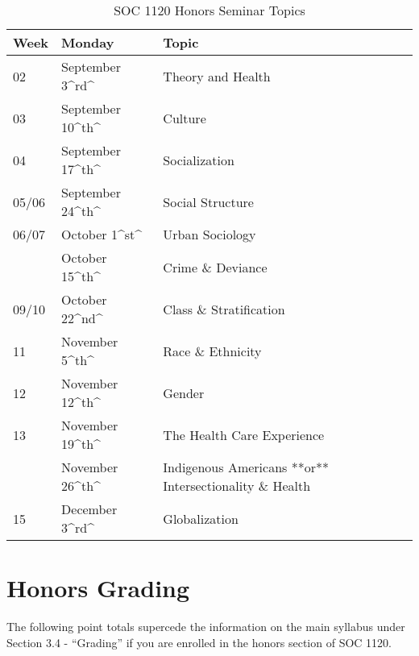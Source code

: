 \documentclass[]{book}
\theoremstyle{definition}
\theoremstyle{definition}
\theoremstyle{definition}
\theoremstyle{remark}
\begin{document}
\begin{table}

\caption{\label{tab:unnamed-chunk-4}SOC 1120 Honors Seminar Topics}
\centering
\begin{tabular}[t]{lll}
\toprule
Week & Monday & Topic\\
\midrule
02 & September 3\textasciicircum{}rd\textasciicircum{} & Theory and Health\\
03 & September 10\textasciicircum{}th\textasciicircum{} & Culture\\
04 & September 17\textasciicircum{}th\textasciicircum{} & Socialization\\
05/06 & September 24\textasciicircum{}th\textasciicircum{} & Social Structure\\
06/07 & October 1\textasciicircum{}st\textasciicircum{} & Urban Sociology\\
\addlinespace
08 & October 15\textasciicircum{}th\textasciicircum{} & Crime \& Deviance\\
09/10 & October 22\textasciicircum{}nd\textasciicircum{} & Class \& Stratification\\
11 & November 5\textasciicircum{}th\textasciicircum{} & Race \& Ethnicity\\
12 & November 12\textasciicircum{}th\textasciicircum{} & Gender\\
13 & November 19\textasciicircum{}th\textasciicircum{} & The Health Care Experience\\
\addlinespace
14 & November 26\textasciicircum{}th\textasciicircum{} & Indigenous Americans **or** Intersectionality \& Health\\
15 & December 3\textasciicircum{}rd\textasciicircum{} & Globalization\\
\bottomrule
\end{tabular}
\end{table}

\hypertarget{honors-grading}{%
\section{Honors Grading}\label{honors-grading}}

The following point totals supercede the information on the main
syllabus under Section 3.4 - ``Grading'' if you are enrolled in the
honors section of SOC 1120.
\end{document}
